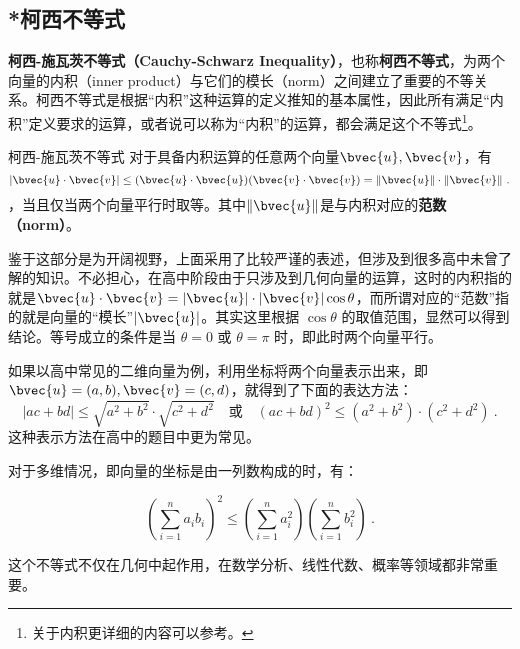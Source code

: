 \subsection{*柯西不等式}


\textbf{柯西-施瓦茨不等式（Cauchy-Schwarz Inequality）}，也称\textbf{柯西不等式}，为两个向量的内积（inner product）与它们的模长（norm）之间建立了重要的不等关系。柯西不等式是根据“内积”这种运算的定义推知的基本属性，因此所有满足“内积”定义要求的运算，或者说可以称为“内积”的运算，都会满足这个不等式\footnote{关于内积更详细的内容可以参考。}。

\begin{theorem}{柯西-施瓦茨不等式}
对于具备内积运算的任意两个向量$\bvec{u},\bvec{v}$，有
\begin{equation}
|\bvec{u} \cdot \bvec{v}| \leq (\bvec{u}\cdot\bvec{u})(\bvec{v}\cdot\bvec{v})=\|\bvec{u}\|\cdot\|\bvec{v}\|~.
\end{equation}
，当且仅当两个向量平行时取等。其中$\|\bvec{u}\|$是与内积对应的\textbf{范数（norm）}。
\end{theorem}

鉴于这部分是为开阔视野，上面采用了比较严谨的表述，但涉及到很多高中未曾了解的知识。不必担心，在高中阶段由于只涉及到几何向量的运算，这时的内积指的就是$\bvec{u}\cdot\bvec{v}=|\bvec{u}|\cdot|\bvec{v}|\cos\theta$，而所谓对应的“范数”指的就是向量的“模长”$|\bvec{u}|$。其实这里根据 $\cos \theta$ 的取值范围，显然可以得到结论。等号成立的条件是当 $\theta = 0$ 或 $\theta = \pi$ 时，即此时两个向量平行。

如果以高中常见的二维向量为例，利用坐标将两个向量表示出来，即$\bvec{u}=(a,b),\bvec{v}=(c,d)$，就得到了下面的表达方法：
\begin{equation}
|ac+bd|\leq\sqrt {a^2 + b^2}\cdot\sqrt{c^2 + d^2}\quad\text{或} \quad(ac+bd)^2\leq(a^2 + b^2)\cdot(c^2 + d^2)~.
\end{equation}
这种表示方法在高中的题目中更为常见。

对于多维情况，即向量的坐标是由一列数构成的时，有：

\begin{equation}
\left( \sum_{i=1}^{n} a_i b_i \right)^2\leq\left( \sum_{i=1}^{n} a_i^2 \right) \left( \sum_{i=1}^{n} b_i^2 \right) ~.
\end{equation}

这个不等式不仅在几何中起作用，在数学分析、线性代数、概率等领域都非常重要。

